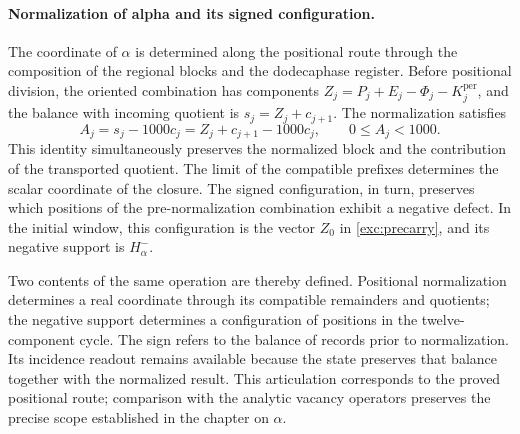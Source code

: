 \paragraph{Normalization of alpha and its signed configuration.}
\label{inc-ampl-clausura}
The coordinate of $\alpha$ is determined along the positional route through
the composition of the regional blocks and the dodecaphase register. Before
positional division, the oriented combination has components
$Z_j=P_j+E_j-\Phi_j-K_j^{\mathrm{per}}$, and the balance with incoming
quotient is $s_j=Z_j+c_{j+1}$. The normalization satisfies
\begin{equation}
 A_j=s_j-1000c_j=Z_j+c_{j+1}-1000c_j,\qquad 0\leq A_j<1000.
 \label{inc-ampl-normalizacion}
\end{equation}
This identity simultaneously preserves the normalized block and the
contribution of the transported quotient. The limit of the compatible
prefixes determines the scalar coordinate of the closure. The signed
configuration, in turn, preserves which positions of the pre-normalization
combination exhibit a negative defect. In the initial window, this
configuration is the vector $Z_0$ in \eqref{exc:precarry}, and its negative
support is $H^-_\alpha$.

Two contents of the same operation are thereby defined. Positional
normalization determines a real coordinate through its compatible remainders
and quotients; the negative support determines a configuration of positions
in the twelve-component cycle. The sign refers to the balance of records
prior to normalization. Its incidence readout remains available because the
state preserves that balance together with the normalized result. This
articulation corresponds to the proved positional route; comparison with the
analytic vacancy operators preserves the precise scope established in the
chapter on $\alpha$.
